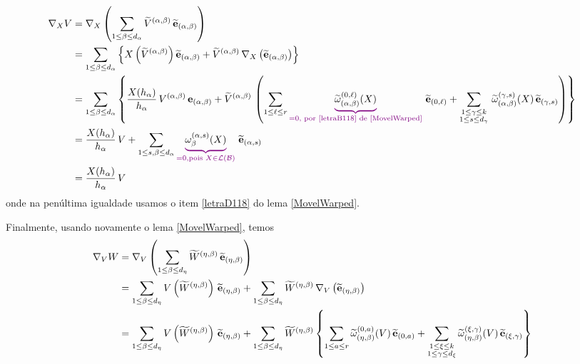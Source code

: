 \begin{demm}
\begin{align*}
\nabla_X{V} &= \nabla_X \left( \sum_{1 \leq \beta \leq d_{\alpha}} \tioC{V}{(\alpha, \beta)} \, \tioB{\be}{(\alpha, \beta)}\right) \\
&= \sum_{1 \leq \beta \leq d_{\alpha}} \left\{ 	X \left(\tioC{V}{(\alpha, \beta)} \right)  \tioB{\be}{(\alpha, \beta)} + \tioC{V}{(\alpha, \beta)} \, \nabla_X\left( \tioB{\be}{(\alpha, \beta)} \right) \right \} \\
&= \sum_{1 \leq \beta \leq d_{\alpha}} \left\{  \frac{X(h_{\alpha})}{h_{\alpha}} \, V^{(\alpha, \beta)} \, \be_{(\alpha, \beta)} + \tioC{V}{(\alpha, \beta)} \, \left( \sum_{1 \leq \ell \leq r}  \Munderbrace{\widetilde{\omega}^{(0, \ell)}_{(\alpha, \beta)} (X)}{=0, \text{ por \ref{letraB118} de \cref{MovelWarped}}} \, \tioB{\be}{(0, \ell)} + \sum_{\substack{1 \leq \gamma \leq k\\
1 \leq s \leq d_{\gamma}
}}\,  \widetilde{\omega}^{(\gamma, s)}_{(\alpha, \beta)} (X) \, \tioB{\be}{(\gamma, s)} \right) \right\} \\
&= \frac{X(h_{\alpha})}{h_{\alpha}} \, V + \sum_{\substack{1 \leq s, \beta \leq d_{\alpha}
}} \Munderbrace{\omega^{(\alpha, s)}_{\beta}(X)}{=0, \text{pois } X \in \mathcal{L}(\mathcal{B})} \, \tioB{\be}{(\alpha, s)} \\
&= \frac{X(h_{\alpha})}{h_{\alpha}} \, V 
\end{align*}
onde na penúltima igualdade usamos o item \ref{letraD118} do lema \cref{MovelWarped}. \par 
Finalmente, usando novamente o lema \cref{MovelWarped}, temos
\begin{align*}
\cn_V W &= \cn_V \parent{ \sum_{1 \leq \beta \leq d_{\eta}} \tioC{W}{(\eta, \beta)} \, \tioB{\be}{(\eta, \beta)} } \\
&= \sum_{1 \leq \beta \leq d_{\eta}}  V\parent{\tioC{W}{(\eta, \beta)} } \, \tioB{\be}{(\eta, \beta)} + \sum_{1 \leq \beta \leq d_{\eta}} \tioC{W}{(\eta, \beta)} \, \cn_V \parent{  \tioB{\be}{(\eta, \beta)} } \\
&=   \sum_{1 \leq \beta \leq d_{\eta}}  V\parent{\tioC{W}{(\eta, \beta)} } \, \tioB{\be}{(\eta, \beta)} + \sum_{1 \leq \beta \leq d_{\eta}} \tioC{W}{(\eta, \beta)} \left\{ \sum_{1 \leq a \leq r}\widetilde{\omega}^{(0, a)}_{(\eta, \beta)} (V) \,  \tioB{\be}{(0, a)}  + \sum_{ \substack{1 \leq \xi \leq k \\
1 \leq \gamma \leq d_{\xi} }}  \widetilde{\omega}^{(\xi, \gamma)}_{(\eta, \beta)} (V) \,  \tioB{\be}{(\xi, \gamma)}    \right\} \\

\end{align*}
\end{demm}
